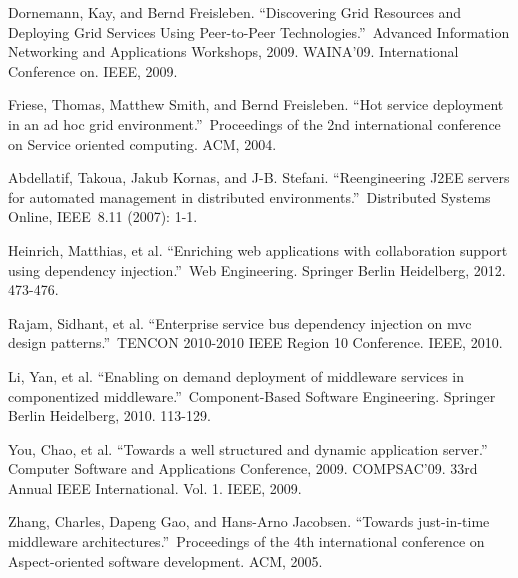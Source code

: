 \documentclass[conference]{IEEEtran}
\begin{document}
\begin{thebibliography}{9}

Dornemann, Kay, and Bernd Freisleben. ``Discovering Grid Resources and Deploying Grid Services Using Peer-to-Peer Technologies.'' Advanced Information Networking and Applications Workshops, 2009. WAINA'09. International Conference on. IEEE, 2009.

Friese, Thomas, Matthew Smith, and Bernd Freisleben. ``Hot service deployment in an ad hoc grid environment.'' Proceedings of the 2nd international conference on Service oriented computing. ACM, 2004.

Abdellatif, Takoua, Jakub Kornas, and J-B. Stefani. ``Reengineering J2EE servers for automated management in distributed environments.'' Distributed Systems Online, IEEE 8.11 (2007): 1-1.

Heinrich, Matthias, et al. ``Enriching web applications with collaboration support using dependency injection.'' Web Engineering. Springer Berlin Heidelberg, 2012. 473-476.

Rajam, Sidhant, et al. ``Enterprise service bus dependency injection on mvc design patterns.'' TENCON 2010-2010 IEEE Region 10 Conference. IEEE, 2010.


Li, Yan, et al. ``Enabling on demand deployment of middleware services in componentized middleware.'' Component-Based Software Engineering. Springer Berlin Heidelberg, 2010. 113-129.

You, Chao, et al. ``Towards a well structured and dynamic application server.'' Computer Software and Applications Conference, 2009. COMPSAC'09. 33rd Annual IEEE International. Vol. 1. IEEE, 2009.

Zhang, Charles, Dapeng Gao, and Hans-Arno Jacobsen. ``Towards just-in-time middleware architectures.'' Proceedings of the 4th international conference on Aspect-oriented software development. ACM, 2005.


\end{thebibliography}
\end{document}
